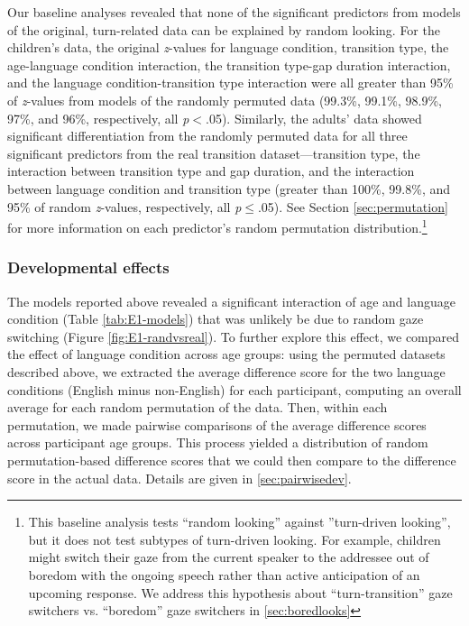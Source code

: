 \documentclass[authoryear, 12pt]{elsarticle}
\begin{document}
Our baseline analyses revealed that none of the significant predictors from models of the original, turn-related data can be explained by random looking. For the children's data, the original \textit{z}-values for language condition, transition type, the age-language condition interaction, the transition type-gap duration interaction, and the language condition-transition type interaction were all greater than 95\% of \textit{z}-values from models of the randomly permuted data (99.3\%, 99.1\%, 98.9\%, 97\%, and 96\%, respectively, all \textit{p}$<$.05). Similarly, the adults' data showed significant differentiation from the randomly permuted data for all three significant predictors from the real transition dataset---transition type, the interaction between transition type and gap duration, and the interaction between language condition and transition type (greater than 100\%, 99.8\%, and 95\% of random \textit{z}-values, respectively, all \textit{p}$\leq$.05). See Section \ref{sec:permutation} for more information on each predictor's random permutation distribution.\footnote{This baseline analysis tests ``random looking'' against ''turn-driven looking'', but it does not test subtypes of turn-driven looking. For example, children might switch their gaze from the current speaker to the addressee out of boredom with the ongoing speech rather than active anticipation of an upcoming response. We address this hypothesis about ``turn-transition'' gaze switchers vs. ``boredom'' gaze switchers in \ref{sec:boredlooks}}


\subsubsection*{Developmental effects}

The models reported above revealed a significant interaction of age and language condition (Table \ref{tab:E1-models}) that was unlikely be due to random gaze switching (Figure \ref{fig:E1-randvsreal}). To further explore this effect, we compared the effect of language condition across age groups: using the permuted datasets described above, we extracted the average difference score for the two language conditions (English minus non-English) for each participant, computing an overall average for each random permutation of the data. Then, within each permutation, we made pairwise comparisons of the average difference scores across participant age groups. This process yielded a distribution of random permutation-based difference scores that we could then compare to the difference score in the actual data. Details are given in \ref{sec:pairwisedev}.
\end{document}
